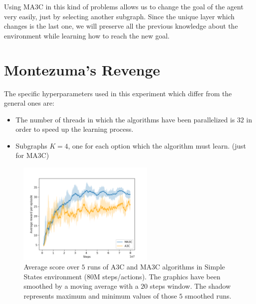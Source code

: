 Using \ac{MA3C} in this kind of problems allows us to change the goal of the agent very easily, just by selecting another
subgraph.
Since the unique layer which changes is the last one, we will preserve all the previous knowledge about the environment
while learning how to reach the new goal.


\section{Montezuma's Revenge}

The specific hyperparameters used in this experiment which differ from the general ones are:
\begin{itemize}
    \item The number of threads in which the algorithms have been parallelized is $32$ in order to speed up the learning
    process.
    \item Subgraphs $K = 4$, one for each option which the algorithm must learn. (just for \ac{MA3C})
\end{itemize}

\begin{figure}[hbtp]
\begin{center}
\includegraphics[width=250]{img/Montezuma_performance.png}
\end{center}
\caption[Montezuma's Revenge performance]
{Average score over $5$ runs of \ac{A3C} and \ac{MA3C} algorithms in Simple States environment (80M steps/actions).
The graphics have been smoothed by a moving average with a $20$ steps window.
The shadow represents maximum and minimum values of those $5$ smoothed runs.}
\label{fig:Montezuma_performance}
\end{figure}

